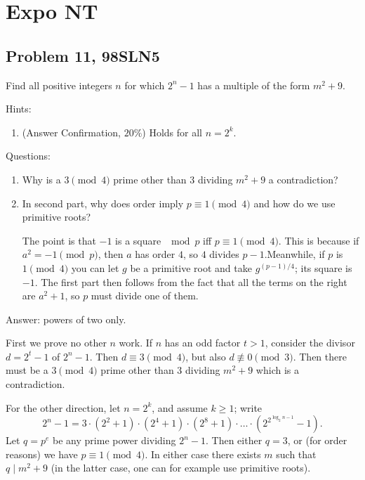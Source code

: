 \documentclass[11pt,twoside]{scrartcl}
\begin{document}
\section{Expo NT}

\subsection{Problem 11, 98SLN5}
\begin{problem}[Shortlist 1998 N5]
    Find all positive integers $n$ for which $2^n-1$ has a multiple of the form $m^2+9$.
\end{problem}

Hints:
\begin{enumerate}
    \item (Answer Confirmation, $20\%$) Holds for all $n = 2^k.$
\end{enumerate}

Questions:
\begin{enumerate}
    \item Why is a $3 \pmod 4$ prime other than $3$ dividing $m^2 + 9$ a contradiction?
    \item In second part, why does order imply $p \equiv 1 \pmod 4$ and how do we use primitive roots?
    
    The point is that $-1$ is a square $\mod p$ iff $p \equiv 1 \pmod 4$. This is because if $a^2 = -1 \pmod p$, then $a$ has order $4$, so $4$ divides $p - 1$.Meanwhile, if $p$ is $1 \pmod 4$ you can let $g$ be a primitive root and take $g^{(p - 1)/4}$; its square is $-1$. The first part then follows from the fact that all the terms on the right are $a^2 + 1$, so $p$ must divide one of them.

\end{enumerate}

\begin{soln}
    Answer: powers of two only.

    First we prove no other $n$ work.
    If $n$ has an odd factor $t > 1$,
    consider the divisor $d = 2^t-1$ of $2^n-1$.
    Then $d \equiv 3 \pmod 4$, but also $d \not\equiv 0 \pmod 3$.
    Then there must be a $3 \pmod 4$ prime other than $3$ dividing $m^2+9$
    which is a contradiction.
    
    For the other direction, let $n = 2^k$, and assume $k \ge 1$; write
    \[ 2^n - 1 = 3 \cdot (2^2+1) \cdot (2^4+1) \cdot (2^8+1)
        \cdot \dots \cdot (2^{2^{\log_2 n - 1}} - 1). \]
    Let $q = p^e$ be any prime power dividing $2^n-1$.
    Then either $q = 3$, or (for order reasons) we have $p \equiv 1 \pmod 4$.
    In either case there exists $m$ such that $q \mid m^2 + 9$
    (in the latter case, one can for example use primitive roots).
\end{soln}
\end{document}
